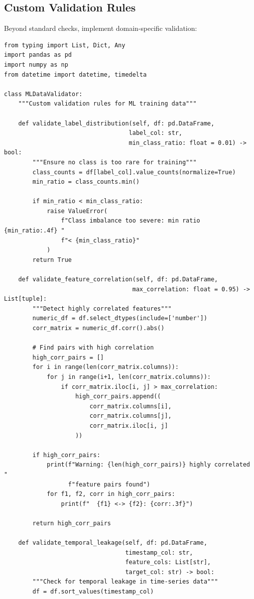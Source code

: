 \subsection{Custom Validation Rules}

Beyond standard checks, implement domain-specific validation:

\begin{lstlisting}[style=python, caption=Custom validation rules for ML data]
from typing import List, Dict, Any
import pandas as pd
import numpy as np
from datetime import datetime, timedelta

class MLDataValidator:
    """Custom validation rules for ML training data"""

    def validate_label_distribution(self, df: pd.DataFrame,
                                   label_col: str,
                                   min_class_ratio: float = 0.01) -> bool:
        """Ensure no class is too rare for training"""
        class_counts = df[label_col].value_counts(normalize=True)
        min_ratio = class_counts.min()

        if min_ratio < min_class_ratio:
            raise ValueError(
                f"Class imbalance too severe: min ratio {min_ratio:.4f} "
                f"< {min_class_ratio}"
            )
        return True

    def validate_feature_correlation(self, df: pd.DataFrame,
                                    max_correlation: float = 0.95) -> List[tuple]:
        """Detect highly correlated features"""
        numeric_df = df.select_dtypes(include=['number'])
        corr_matrix = numeric_df.corr().abs()

        # Find pairs with high correlation
        high_corr_pairs = []
        for i in range(len(corr_matrix.columns)):
            for j in range(i+1, len(corr_matrix.columns)):
                if corr_matrix.iloc[i, j] > max_correlation:
                    high_corr_pairs.append((
                        corr_matrix.columns[i],
                        corr_matrix.columns[j],
                        corr_matrix.iloc[i, j]
                    ))

        if high_corr_pairs:
            print(f"Warning: {len(high_corr_pairs)} highly correlated "
                  f"feature pairs found")
            for f1, f2, corr in high_corr_pairs:
                print(f"  {f1} <-> {f2}: {corr:.3f}")

        return high_corr_pairs

    def validate_temporal_leakage(self, df: pd.DataFrame,
                                  timestamp_col: str,
                                  feature_cols: List[str],
                                  target_col: str) -> bool:
        """Check for temporal leakage in time-series data"""
        df = df.sort_values(timestamp_col)


\end{lstlisting}

